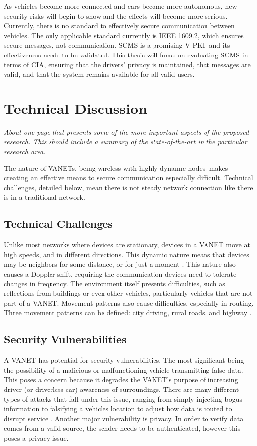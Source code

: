 \documentclass {article}
\newcommand{\sechint}[1]{\small{\emph{#1}} \bigskip}
\begin{document}
As vehicles become more connected and cars become more autonomous, new security risks will begin to show and the effects will become more serious. Currently, there is no standard to effectively secure communication between vehicles. The only applicable standard currently is IEEE 1609.2, which ensures secure messages, not communication. SCMS is a promising V-PKI, and its effectiveness needs to be validated. This thesis will focus on evaluating SCMS in terms of CIA, ensuring that the drivers' privacy is maintained, that messages are valid, and that the system remains available for all valid users.

\section{Technical Discussion}{\sechint{About one page that presents some of the more important aspects of the proposed research. This should include a summary of the state-of-the-art in the particular research area.}}

The nature of VANETs, being wireless with highly dynamic nodes, makes creating an effective means to secure communication especially difficult. Technical challenges, detailed below, mean there is not steady network connection like there is in a traditional network. 

\subsection{Technical Challenges}
Unlike most networks where devices are stationary, devices in a VANET move at high speeds, and in different directions. This dynamic nature means that devices may be neighbors for some distance, or for just a moment \autocite{CommPatterns}. This nature also causes a Doppler shift, requiring the communication devices need to tolerate changes in frequency. The environment itself presents difficulties, such as reflections from buildings or even other vehicles, particularly vehicles that are not part of a VANET. Movement patterns also cause difficulties, especially in routing. Three movement patterns can be defined: city driving, rural roads, and highway \autocite{CommPatterns}.

\subsection{Security Vulnerabilities}
A VANET has potential for security vulnerabilities. The most significant being the possibility of a malicious or malfunctioning vehicle transmitting false data. This poses a concern because it degrades the VANET's purpose of increasing driver (or driverless car) awareness of surroundings. There are many different types of attacks that fall under this issue, ranging from simply injecting bogus information to falsifying a vehicles location to adjust how data is routed to disrupt service \autocite{SecVANet}. Another major vulnerability is privacy. In order to verify data comes from a valid source, the sender needs to be authenticated, however this poses a privacy issue. 
\end{document}
